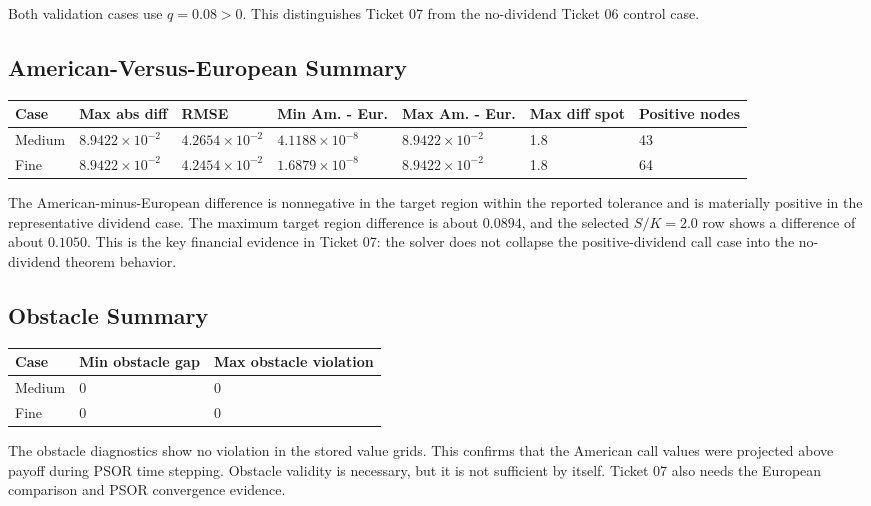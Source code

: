 \documentclass[11pt,a4paper]{article}
\begin{document}
Both validation cases use \(q=0.08>0\). This distinguishes Ticket 07 from the no-dividend
Ticket 06 control case.

\subsection{American-Versus-European Summary}

{\footnotesize
\setlength{\tabcolsep}{3pt}
\begin{longtable}{@{}L{0.09\textwidth}L{0.13\textwidth}L{0.11\textwidth}L{0.12\textwidth}L{0.12\textwidth}L{0.10\textwidth}L{0.10\textwidth}@{}}
\toprule
Case & Max abs diff & RMSE & Min Am. - Eur. & Max Am. - Eur. & Max diff spot & Positive nodes \\
\midrule
\endhead
Medium & \(8.9422\times10^{-2}\) & \(4.2654\times10^{-2}\) & \(4.1188\times10^{-8}\) & \(8.9422\times10^{-2}\) & 1.8 & 43 \\
Fine & \(8.9422\times10^{-2}\) & \(4.2454\times10^{-2}\) & \(1.6879\times10^{-8}\) & \(8.9422\times10^{-2}\) & 1.8 & 64 \\
\bottomrule
\end{longtable}
}

The American-minus-European difference is nonnegative in the target region within the reported
tolerance and is materially positive in the representative dividend case. The maximum target
region difference is about \(0.0894\), and the selected \(S/K=2.0\) row shows a difference of
about \(0.1050\). This is the key financial evidence in Ticket 07: the solver does not collapse
the positive-dividend call case into the no-dividend theorem behavior.

\subsection{Obstacle Summary}

\begin{longtable}{@{}L{0.16\textwidth}L{0.18\textwidth}L{0.22\textwidth}@{}}
\toprule
Case & Min obstacle gap & Max obstacle violation \\
\midrule
\endhead
Medium & 0 & 0 \\
Fine & 0 & 0 \\
\bottomrule
\end{longtable}

The obstacle diagnostics show no violation in the stored value grids. This confirms that the
American call values were projected above payoff during PSOR time stepping. Obstacle validity is
necessary, but it is not sufficient by itself. Ticket 07 also needs the European comparison and
PSOR convergence evidence.
\end{document}
